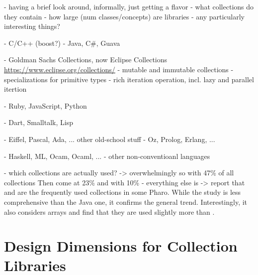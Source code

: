 \documentclass[sigconf, 10pt]{acmart}
\begin{document}
\begin{note}
- having a brief look around, informally, just getting a flavor
 - what collections do they contain
 - how large (num classes/concepts) are libraries
 - any particularly interesting things?

- C/C++ (boost?)
- Java, C\#, Guava

  - Goldman Sachs Collections, now Eclipse Collections
  \url{https://www.eclipse.org/collections/} %
   - mutable and immutable collections
   - specializations for primitive types
   - rich iteration operation, incl. lazy and parallel itertion
  

- Ruby, JavaScript, Python

- Dart, Smalltalk, Lisp

- Eiffel, Pascal, Ada, ... other old-school stuff
- Oz, Prolog, Erlang, ... 

- Haskell, ML, Ocam, Ocaml, ...
- other non-conventioanl languages

- which collections are actually used?
 ->  overwhelmingly so with 47\% of all collections
    Then come  at 23\% and  with 10\% \citep{Costa:2017:ESU} 
    - everything else is 
 -> \citet[sec. 9.2]{Bergel:2018} report that  and  are the frequently used collections in some Pharo.
 While the study is less comprehensive than the Java one, it confirms the general trend. Interestingly, it also considers arrays and find that they are used slightly more than .

\end{note}

\section{Design Dimensions for Collection Libraries}
\end{document}
